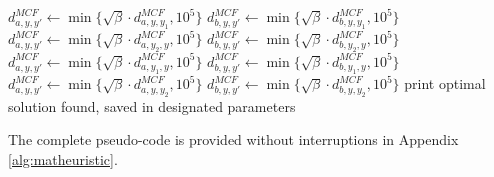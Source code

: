\documentclass[../thesis.tex]{subfiles}
\begin{document}
\begin{algorithm}[H]
\begin{algorithmic}
    \STATE $d^{MCF}_{a,y,y'}\gets\min\{\sqrt\beta\cdot d^{MCF}_{a,y,y_1},10^5\}$
    \STATE $d^{MCF}_{b,y,y'}\gets\min\{\sqrt\beta\cdot d^{MCF}_{b,y,y_1},10^5\}$    
    \STATE $d^{MCF}_{a,y,y'}\gets\min\{\sqrt\beta\cdot d^{MCF}_{a,y_2,y},10^5\}$
    \STATE $d^{MCF}_{b,y,y'}\gets\min\{\sqrt\beta\cdot d^{MCF}_{b,y_2,y},10^5\}$
    \ENDFOR
    \STATE $d^{MCF}_{a,y,y'}\gets\min\{\sqrt\beta\cdot d^{MCF}_{a,y_1,y},10^5\}$
    \STATE $d^{MCF}_{b,y,y'}\gets\min\{\sqrt\beta\cdot d^{MCF}_{b,y_1,y},10^5\}$    
    \STATE $d^{MCF}_{a,y,y'}\gets\min\{\sqrt\beta\cdot d^{MCF}_{a,y,y_2},10^5\}$
    \STATE $d^{MCF}_{b,y,y'}\gets\min\{\sqrt\beta\cdot d^{MCF}_{b,y,y_2},10^5\}$
    \ENDFOR
    \ENDFOR
    \ENDIF
    \ENDIF
    \ENDWHILE
    \STATE print optimal solution found, saved in designated parameters

    \end{algorithmic}
    \end{algorithm}

The complete pseudo-code is provided without interruptions in Appendix \ref{alg:matheuristic}.
\end{document}
